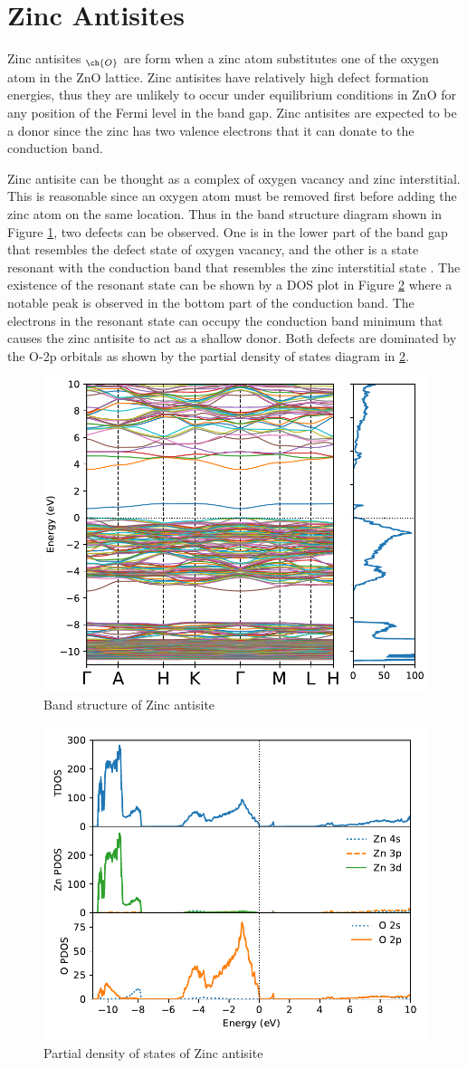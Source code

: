 \section{Zinc Antisites}
Zinc antisites $_{\ch{O}}$ are form when a zinc atom substitutes one of the oxygen atom in the ZnO lattice.
Zinc antisites have relatively high defect formation energies, thus they are unlikely to occur under equilibrium conditions in ZnO for any position of the Fermi level in the band gap. Zinc antisites are expected to be a donor since the  zinc has two valence electrons that it can donate to the conduction band.

Zinc antisite can be thought as a complex of oxygen vacancy and zinc interstitial. This is reasonable since an oxygen atom must be removed first before adding the zinc atom on the same location.  Thus in the band structure diagram shown in Figure \ref{fig:bands.Zn-anti}, two defects can be observed. One is in the lower part of the band gap that resembles the defect state of oxygen vacancy, and the other is a state resonant with the conduction band that resembles the zinc interstitial state \citep{Janotti2007}. The existence of the resonant state can be shown by a DOS plot in Figure \ref{fig:dos.Zn-anti} where a notable peak is observed in the bottom part of the conduction band. The electrons in the resonant state can occupy the conduction band minimum that causes the zinc antisite to act as a shallow donor. Both defects are dominated by the O-2p orbitals as shown by the partial density of states diagram in \ref{fig:dos.Zn-anti}.

\begin{figure}[tbh!]
	\centering
	\includegraphics[width=0.6\linewidth]{"images/rnd/band-dos_Zn_anti"}
	\caption[Band structure of Zinc antisite]{Band structure of Zinc antisite}
	\label{fig:bands.Zn-anti}
\end{figure}

\begin{figure}[tbh!]
	\centering
	\includegraphics[width=0.6\linewidth]{"images/rnd/dos-pdos_Zn_anti"}
	\caption[Partial density of states of Zinc antisite]{Partial density of states of Zinc antisite}
	\label{fig:dos.Zn-anti}
\end{figure}


